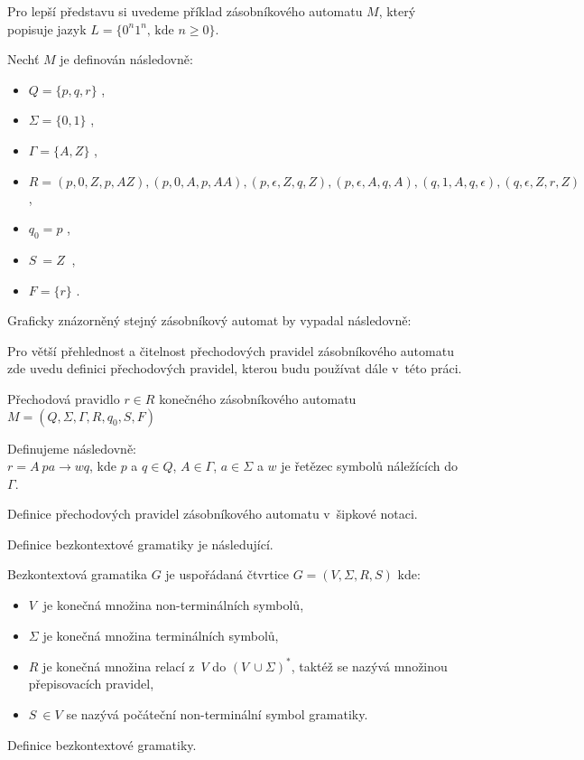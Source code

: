 Pro lepší představu si uvedeme příklad zásobníkového automatu \(M\), který popisuje jazyk \( L = \{ 0^n 1^n \text{, kde } n \geq 0 \} \).

Nechť \(M\) je definován následovně:  
\begin{itemize}
	\item \( Q = \{ p, q, r\} \) ,
	\item \( \Sigma = \{0, 1\} \) ,
	\item \( \Gamma =  \{A, Z\}\) ,
	\item \( R = (p, 0, Z, p, AZ) , (p,0,A,p,AA), (p,\epsilon,Z,q,Z), (p,\epsilon,A,q,A), (q,1,A,q,\epsilon), (q,\epsilon,Z,r,Z) \),
	\item \( q_0 = p\) ,
	\item \( S~= Z~\) ,
	\item \( F = \{r\} \) .
\end{itemize}

Graficky znázorněný stejný zásobníkový automat by vypadal následovně:



Pro větší přehlednost a čitelnost přechodových pravidel zásobníkového automatu zde uvedu definici přechodových pravidel, kterou budu používat dále v~této práci.

\begin{framed}
	\begin{flushleft}Přechodová pravidlo $r \in R$ konečného zásobníkového automatu \( M = (Q, \Sigma, \Gamma, R, q_0, S, F) \)\end{flushleft} 
	Definujeme následovně: \\
	\( r = A~p a \rightarrow w q \), kde $p$ a $ q \in Q$, $A \in \Gamma$, $a \in \Sigma$ a $w$ je řetězec symbolů náležících do $\Gamma$.
\end{framed}
\begin{mydef}
	Definice přechodových pravidel zásobníkového automatu v~šipkové notaci.
\end{mydef}


Definice bezkontextové gramatiky je následující. \cite{CFG}

\begin{framed}
	Bezkontextová gramatika \( G \) je uspořádaná čtvrtice \( G = (V, \Sigma, R, S) \) kde:
	\begin{itemize}
		\item \( V~\) je konečná množina non-terminálních symbolů,
		\item \( \Sigma \) je konečná množina terminálních symbolů,
		\item \( R \) je konečná množina relací z~\(V\) do \( (V~\cup \Sigma )^* \), taktéž se nazývá množinou přepisovacích pravidel,
		\item \( S~\in V\) se nazývá počáteční non-terminální symbol gramatiky.
	\end{itemize}
\end{framed}
\begin{mydef}
	Definice bezkontextové gramatiky.
\end{mydef}


